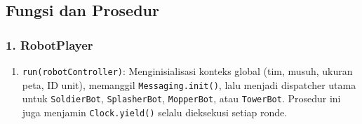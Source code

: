 \newpage
\subsection{Fungsi dan Prosedur}

\subsubsection{1. RobotPlayer}
\begin{enumerate}
	\item \texttt{run(robotController)}:
	      Menginisialisasi konteks global (tim, musuh, ukuran peta, ID unit), memanggil \texttt{Messaging.init()}, lalu menjadi dispatcher utama untuk \texttt{SoldierBot}, \texttt{SplasherBot}, \texttt{MopperBot}, atau \texttt{TowerBot}. Prosedur ini juga menjamin \texttt{Clock.yield()} selalu dieksekusi setiap ronde.
\end{enumerate}

